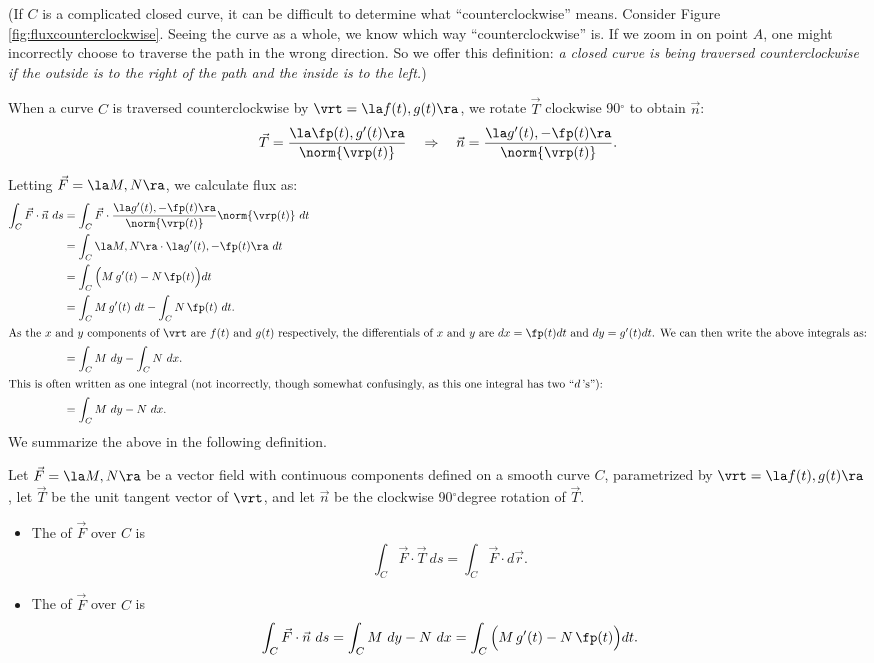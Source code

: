 (If $C$ is a complicated closed curve, it can be difficult to determine what ``counterclockwise'' means. Consider Figure \ref{fig:fluxcounterclockwise}. Seeing the curve as a whole, we know which way ``counterclockwise'' is. If we zoom in on point $A$, one might incorrectly choose to traverse the path in the wrong direction. So we offer this definition: \textit{a closed curve is being traversed counterclockwise if the outside is to the right of the path and the inside is to the left.})

When a curve $C$ is traversed counterclockwise by $\vrt = \la f(t), g(t)\ra$, we rotate $\vec T$ clockwise 90$^\circ$  to obtain $\vec n$:
$$\vec T = \frac{\la \fp(t),g'(t)\ra}{\norm{\vrp(t)}} \quad \Rightarrow \quad \vec n = \frac{\la g'(t),-\fp(t)\ra}{\norm{\vrp(t)}}.$$

Letting $\vec F = \la M, N\ra$, we calculate flux as:
\begin{align*}
\int_C \vec F\cdot \vec n\ ds &= \int_C \vec F\cdot \frac{\la g'(t),-\fp(t)\ra}{\norm{\vrp(t)}} \norm{\vrp(t)}\ dt \\
				&= \int_C \la M, N\ra \cdot \la g'(t),-\fp(t)\ra\ dt \\
				&= \int_C \Big(M\,g'(t) - N\,\fp(t)\Big)dt\\
				&= \int_C M\,g'(t)\ dt - \int_C N\,\fp(t)\ dt.\\
				\intertext{As the $x$ and $y$ components of $\vrt$ are $f(t)$ and $g(t)$ respectively, the differentials of $x$ and $y$ are $dx = \fp(t)dt$ and $dy=g'(t)dt$. We can then write the above integrals as:}
				&= \int_C M\ dy - \int_C N\ dx.\\
				\intertext{This is often written as one integral (not incorrectly, though somewhat confusingly, as this one integral has two ``$d$\,'s''):}
				&=\int_CM\ dy -N\ dx.
\end{align*}
We summarize the above in the following definition.

{Let $\vec F=\la M,N\ra$ be a vector field with continuous components defined on a smooth curve $C$, parametrized by $\vrt =\la f(t),g(t)\ra$, let $\vec T$ be the unit tangent vector of $\vrt$, and let $\vec n$ be the clockwise 90$^\circ$degree rotation of $\vec T$.
\begin{itemize}
	\item The  of $\vec F$ over $C$ is
$$\int_C \vec F\cdot\vec T\ ds=\int_C \vec F\cdot d\vec r.$$
	\item The  of $\vec F$ over $C$ is
$$\int_C \vec F\cdot \vec n\ ds =  \int_C M\ dy -N\ dx = \int_C\Big(M\,g'(t) - N\,\fp(t)\Big)dt. $$
\end{itemize}
}

